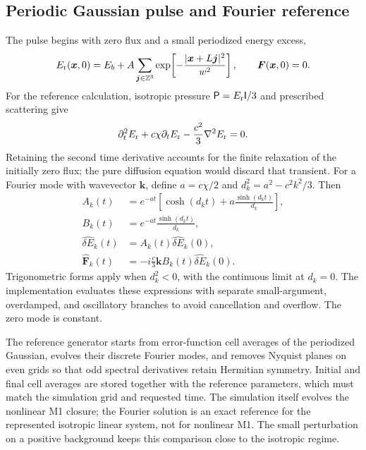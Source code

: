 \documentclass[manuscript]{aastex7}
\newcommand{\vct}[1]{\boldsymbol{#1}}
\newcommand{\Er}{E_{\rm r}}
\newcommand{\Fr}{\vct{F}}
\newcommand{\Prad}{\mathsf{P}}
\newcommand{\Id}{\mathsf{I}}
\begin{document}
\subsection{Periodic Gaussian pulse and Fourier reference}
The pulse begins with zero flux and a small periodized energy excess,
\begin{equation}
 \Er(\vct{x},0)=E_b+A
 \sum_{\vct{j}\in\mathbb{Z}^3}
 \exp\!\left[-\frac{|\vct{x}+L\vct{j}|^2}{w^2}\right],
 \qquad \Fr(\vct{x},0)=0.
\end{equation}
For the reference calculation, isotropic pressure
$\Prad=\Er\Id/3$ and prescribed scattering give
\begin{equation}
 \partial_t^2\Er+c\chi\partial_t\Er
       -\frac{c^2}{3}\nabla^2\Er=0.
 \label{eq:telegraph}
\end{equation}
Retaining the second time derivative accounts for the finite relaxation
of the initially zero flux; the pure diffusion equation would discard
that transient. For a Fourier mode with wavevector $\vct{k}$, define
$a=c\chi/2$ and $d_k^2=a^2-c^2k^2/3$. Then
\begin{align}
 A_k(t)&=e^{-at}\left[\cosh(d_kt)
                       +a\frac{\sinh(d_kt)}{d_k}\right],\\
 B_k(t)&=e^{-at}\frac{\sinh(d_kt)}{d_k},\\
 \widehat{\delta E}_k(t)&=A_k(t)\widehat{\delta E}_k(0),\\
 \widehat{\Fr}_k(t)&=-i\frac{c}{3}\vct{k}B_k(t)
                               \widehat{\delta E}_k(0).
 \label{eq:fourier}
\end{align}
Trigonometric forms apply when $d_k^2<0$, with the continuous limit at
$d_k=0$. The implementation evaluates these expressions with separate
small-argument, overdamped, and oscillatory branches to avoid cancellation
and overflow. The zero mode is constant.

The reference generator starts from error-function cell averages of the
periodized Gaussian, evolves their discrete Fourier modes, and removes
Nyquist planes on even grids so that odd spectral derivatives retain
Hermitian symmetry. Initial and final cell averages are stored together
with the reference parameters, which must match the simulation grid and
requested time. The simulation itself evolves the nonlinear M1 closure;
the Fourier solution is an exact reference for the represented isotropic
linear system, not for nonlinear M1. The small perturbation on a positive
background keeps this comparison close to the isotropic regime.
\end{document}

